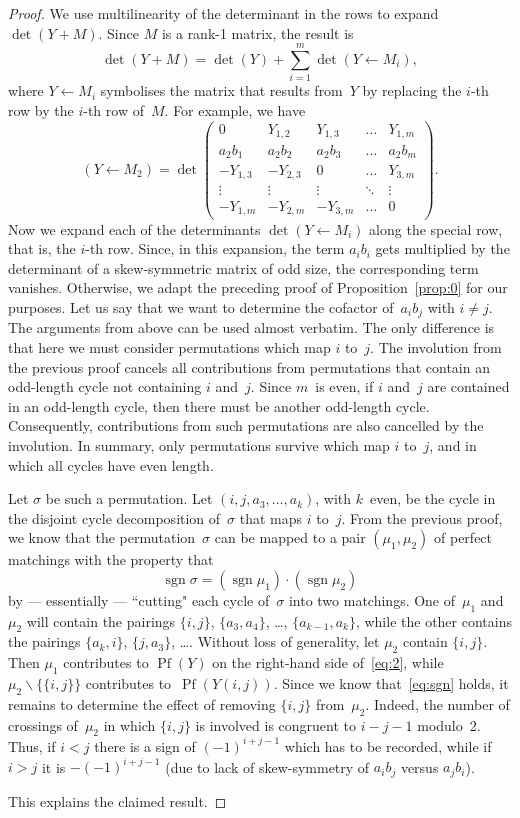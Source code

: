 \documentclass[12pt,reqno]{amsart}
\numberwithin{equation}{section}
\theoremstyle{definition}
\theoremstyle{remark}
\def\sgn{\operatorname{sgn}}
\def\Pf{\operatorname{Pf}}
\def\si{\sigma}
\begin{document}
\begin{proof}
We use multilinearity of the determinant in the rows to expand
$\det(Y+M)$. Since $M$ is a rank-1 matrix, the result is
$$
\det(Y+M)=\det(Y)+\sum_{i=1}^{m}\det(Y\leftarrow M_i),
$$
where $Y\leftarrow M_i$ symbolises the matrix that results from~$Y$ by
replacing 
the $i$-th row by the $i$-th row of~$M$. For example, we have
$$
(Y\leftarrow M_2)=
\det\begin{pmatrix}
0&Y_{1,2}&Y_{1,3}&\dots&Y_{1,m}\\
a_2b_1&a_2b_2&a_2b_3&\dots&a_2b_{m}\\
-Y_{1,3}&-Y_{2,3}&0&\dots&Y_{3,m}\\
\vdots&\vdots&\vdots&\ddots&\vdots\\
-Y_{1,m}&-Y_{2,m}&-Y_{3,m}&\dots&0
\end{pmatrix}.
$$
Now we expand each of the determinants $\det(Y\leftarrow M_i)$
along the special row, that is, the $i$-th row.
Since, in this expansion, the term $a_ib_i$ gets multiplied
by the determinant of a skew-symmetric matrix of odd size,
the corresponding term vanishes. Otherwise, we adapt the preceding proof
of Proposition~\ref{prop:0} for our purposes. Let us say
that we want to determine the cofactor of~$a_ib_j$ with $i\ne j$. 
The arguments from above can be used almost verbatim. 
The only difference is that here we must consider permutations
which map $i$ to~$j$. The involution from the previous proof cancels all
contributions from permutations that contain an odd-length cycle not
containing $i$ and~$j$. Since $m$~is even, 
if $i$ and~$j$ are contained in an odd-length cycle,
then there must be another odd-length cycle. Consequently,
contributions from such permutations are also cancelled by the
involution. In summary, only permutations survive 
which map $i$ to~$j$, and in which all cycles have even length.

Let $\si$ be such a permutation. Let
$(i,j,a_3,\dots,a_k)$, with $k$~even, be the cycle in the disjoint
cycle decomposition of~$\si$ that maps $i$ to~$j$.
From the previous proof, we know that the permutation~$\si$
can be mapped to a pair $(\mu_1,\mu_2)$ of perfect matchings
with the property that
\begin{equation} \label{eq:sgn} 
\sgn\si=(\sgn\mu_1)\cdot(\sgn\mu_2)
\end{equation} 
by --- essentially --- ``cutting" each cycle of~$\si$ into
two matchings. One of~$\mu_1$ and~$\mu_2$ will contain the
pairings $\{i,j\}$, $\{a_3,a_4\}$, \dots, $\{a_{k-1},a_k\}$,
while the other contains the pairings $\{a_k,i\}$, $\{j,a_3\}$, \dots.
Without loss of generality, let $\mu_2$ contain $\{i,j\}$.
Then $\mu_1$ contributes to $\Pf(Y)$ on the right-hand side
of~\eqref{eq:2}, while $\mu_2\backslash\{\{i,j\}\}$ contributes
to~$\Pf(Y(i,j))$. Since we know that~\eqref{eq:sgn} holds, it remains
to determine the effect of removing $\{i,j\}$ from~$\mu_2$.
Indeed, the number of crossings of~$\mu_2$ in which $\{i,j\}$
is involved is congruent to $i-j-1$ modulo~2. Thus, if $i<j$
there is a sign of $(-1)^{i+j-1}$ which has to be recorded,
while if $i>j$ it is $-(-1)^{i+j-1}$ (due to lack of skew-symmetry
of $a_ib_j$ versus $a_jb_i$).

This explains the claimed result.
\end{proof}
\end{document}
